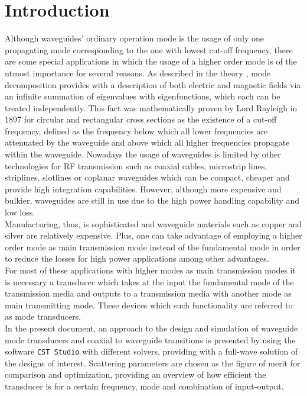 \documentclass[english,twoside]{article}
\begin{document}
	\section{Introduction}
		Although waveguides' ordinary operation mode is the usage of only one propagating mode corresponding to the one with lowest cut-off frequency, there are some special applications in which the usage of a higher order mode is of the utmost importance for several reasons. As described in the theory \cite{collin}, mode decomposition provides with a description of both electric and magnetic fields via an infinite summation of eigenvalues with eigenfunctions, which each can be treated independently. This fact was mathematically proven by Lord Rayleigh in 1897 for circular and rectangular cross sections as the existence of a cut-off frequency, defined as the frequency below which all lower frequencies are attenuated by the waveguide and above which all higher frequencies propagate within the waveguide. Nowadays the usage of waveguides is limited by other technologies for RF transmission such as coaxial cables, microstrip lines, striplines, slotlines or coplanar waveguides which can be compact, cheaper and provide high integration capabilities. However, although more expensive and bulkier, waveguides are still in use due to the high power handling capability and low loss.\\
		
		Manufacturing, thus, is sophisticated and waveguide materials such as copper and silver are relatively expensive. Plus, one can take advantage of employing a higher order mode as main transmission mode instead of the fundamental mode in order to reduce the losses for high power applications among other advantages.\\
		
		For most of these applications with higher modes as main transmission modes it is necessary a transducer which takes at the input the fundamental mode of the transmission media and outputs to a transmission media with another mode as main transmitting mode. These devices which such functionality are referred to as mode transducers.\\
		
		In the present document, an approach to the design and simulation of waveguide mode transducers and coaxial to waveguide transitions is presented by using the software \texttt{CST Studio} with different solvers, providing with a full-wave solution of the designs of interest. Scattering parameters are chosen as the figure of merit for comparison and optimization, providing an overview of how efficient the transducer is for a certain frequency, mode and combination of input-output.\\
		
\end{document}

